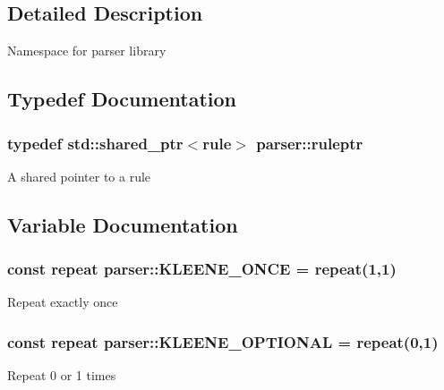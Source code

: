 \subsection{Detailed Description}
Namespace for parser library 

\subsection{Typedef Documentation}
\subsubsection[{\texorpdfstring{ruleptr}{ruleptr}}]{\setlength{\rightskip}{0pt plus 5cm}typedef std\+::shared\+\_\+ptr$<${\bf rule}$>$ {\bf parser\+::ruleptr}}\hypertarget{namespaceparser_a85b2df48287fddaca144a5f6c01b4761}{}\label{namespaceparser_a85b2df48287fddaca144a5f6c01b4761}
A shared pointer to a rule 

\subsection{Variable Documentation}
\subsubsection[{\texorpdfstring{K\+L\+E\+E\+N\+E\+\_\+\+O\+N\+CE}{KLEENE_ONCE}}]{\setlength{\rightskip}{0pt plus 5cm}const {\bf repeat} parser\+::\+K\+L\+E\+E\+N\+E\+\_\+\+O\+N\+CE = {\bf repeat}(1,1)}\hypertarget{namespaceparser_a1856f1b1a3996f6388d8686cf35daff9}{}\label{namespaceparser_a1856f1b1a3996f6388d8686cf35daff9}
Repeat exactly once 
\subsubsection[{\texorpdfstring{K\+L\+E\+E\+N\+E\+\_\+\+O\+P\+T\+I\+O\+N\+AL}{KLEENE_OPTIONAL}}]{\setlength{\rightskip}{0pt plus 5cm}const {\bf repeat} parser\+::\+K\+L\+E\+E\+N\+E\+\_\+\+O\+P\+T\+I\+O\+N\+AL = {\bf repeat}(0,1)}\hypertarget{namespaceparser_ac97f2803cfa3a6e9328865ea4744d4d6}{}\label{namespaceparser_ac97f2803cfa3a6e9328865ea4744d4d6}
Repeat 0 or 1 times 
